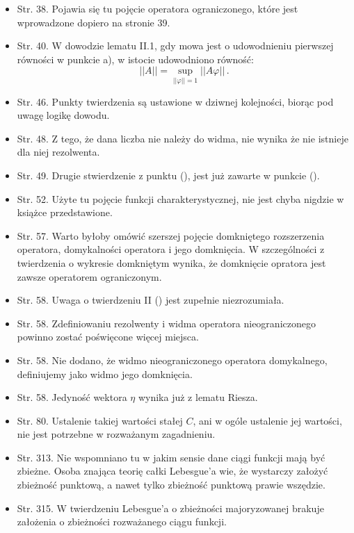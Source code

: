 \documentclass[a4paper,11pt]{article}
\begin{document}
\begin{itemize}
\item Str. 38. Pojawia się tu pojęcie operatora ograniczonego, które
  jest wprowadzone dopiero na stronie 39.
\item Str. 40. W dowodzie lematu II.1, gdy mowa jest o udowodnieniu
  pierwszej równości w punkcie a), w istocie udowodniono równość:
  $$|| A || = \sup_{ || \varphi || = 1 } || A \varphi || \, .$$
\item Str. 46. Punkty twierdzenia są ustawione w dziwnej kolejności,
  biorąc pod uwagę logikę dowodu.
\item Str. 48. Z tego, że dana liczba nie należy do widma, nie wynika
  że nie istnieje dla niej rezolwenta.
\item Str. 49. Drugie stwierdzenie z punktu (), jest już
  zawarte w punkcie ().
\item Str. 52. Użyte tu pojęcie funkcji charakterystycznej, nie jest
  chyba nigdzie w książce przedstawione.
\item Str. 57. Warto byłoby omówić szerszej pojęcie domkniętego
  rozszerzenia operatora, domykalności operatora i jego domknięcia. W
  szczególności z twierdzenia o wykresie domkniętym wynika, że
  domknięcie opratora jest zawsze operatorem ograniczonym.
\item Str. 58. Uwaga o twierdzeniu II () jest zupełnie
  niezrozumiała.
\item Str. 58. Zdefiniowaniu rezolwenty i widma operatora
  nieograniczonego powinno zostać poświęcone więcej miejsca.
\item Str. 58. Nie dodano, że widmo nieograniczonego operatora
  domykalnego, definiujemy jako widmo jego domknięcia.
\item Str. 58. Jedyność wektora $\eta$ wynika już z lematu Riesza.
\item Str. 80. Ustalenie takiej wartości stałej $C$, ani w ogóle
  ustalenie jej wartości, nie jest potrzebne w rozważanym zagadnieniu.
\item Str. 313. Nie wspomniano tu w jakim sensie dane ciągi funkcji
  mają być zbieżne. Osoba znająca teorię całki Lebesgue'a wie, że
  wystarczy założyć zbieżność punktową, a nawet tylko zbieżność
  punktową prawie wszędzie.
\item Str. 315. W twierdzeniu Lebesgue'a o zbieżności majoryzowanej
  brakuje założenia o zbieżności rozważanego ciągu funkcji.
\end{itemize}
\end{document}
